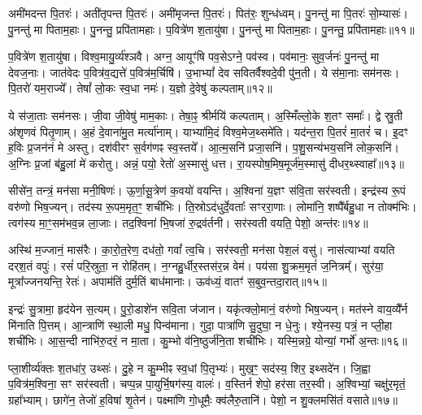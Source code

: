 अमी॑मदन्त पि॒तरः॑।
अती॑तृपन्त पि॒तरः॑।
अमी॑मृजन्त पि॒तरः॑।
पित॑रः॒ शुन्ध॑ध्वम्।
पु॒नन्तु॑ मा पि॒तरः॑ सो॒म्यासः॑।
पु॒नन्तु॑ मा पिताम॒हाः।
पु॒नन्तु॒ प्रपि॑तामहाः।
प॒वित्रे॑ण श॒तायु॑षा।
पु॒नन्तु॑ मा पिताम॒हाः।
पु॒नन्तु॒ प्रपि॑तामहाः॥११॥

प॒वित्रे॑ण श॒तायु॑षा।
विश्व॒मायु॒र्व्य॑श्ञवै।
अग्न॒ आयूꣳ॑षि पव॒से\-ऽग्ने॒ पव॑स्व।
पव॑मानः॒ सुव॒र्जनः॑ पु॒नन्तु॑ मा देवज॒नाः।
जात॑वेदः प॒वित्र॑व॒द्यत्ते॑ प॒वित्र॑म॒र्चिषि॑।
उ॒भाभ्यां᳚ देव सवितर्वैश्वदे॒वी पु॑न॒ती।
ये स॑मा॒नाः सम॑नसः।
पि॒तरो॑ यम॒राज्ये᳚।
तेषां᳚ लो॒कः स्व॒धा नमः॑।
य॒ज्ञो दे॒वेषु॑ कल्पताम्॥१२॥

ये स॑जा॒ताः सम॑नसः।
जी॒वा जी॒वेषु॑ माम॒काः।
तेषा॒ꣴ॒ श्रीर्मयि॑ कल्पताम्।
अ॒स्मिँल्लो॒के श॒तꣳ समाः᳚।
द्वे स्रु॒ती अ॑शृणवं पितृ॒णाम्।
अ॒हं दे॒वाना॑मु॒त मर्त्या॑नाम्।
याभ्या॑मि॒दं विश्व॒मेज॒थ्समे॑ति।
यद॑न्त॒रा पि॒तरं॑ मा॒तरं॑ च।
इ॒दꣳ ह॒विः प्र॒जन॑नं मे अस्तु।
दश॑वीरꣳ स॒र्वग॑णꣴ स्व॒स्तये᳚।
आ॒त्म॒सनि॑ प्रजा॒सनि॑।
प॒शु॒सन्य॑भय॒सनि॑ लोक॒सनि॑।
अ॒ग्निः प्र॒जां ब॑हु॒लां मे॑ करोतु।
अन्नं॒ पयो॒ रेतो॑ अ॒स्मासु॑ धत्त।
रा॒यस्पोष॒मिष॒मूर्ज॑म॒स्मासु॑ दीधर॒थ्स्वाहा᳚॥१३॥\anuvakamend[इ॒न्द्रि॒याय॑ पि॒तरः॑ श॒तायु॑षा पु॒नन्तु॑ मा पिताम॒हाः पु॒नन्तु॒ प्रपि॑तामहाः कल्पताꣴ स्व॒स्तये॒ पञ्च॑ च]

सीसे॑न॒ तन्त्रं॒ मन॑सा मनी॒षिणः॑।
ऊ॒र्णा॒सू॒त्रेण॑ क॒वयो॑ वयन्ति।
अ॒श्विना॑ य॒ज्ञꣳ स॑वि॒ता सर॑स्वती।
इन्द्र॑स्य रू॒पं वरु॑णो भिष॒ज्यन्।
तद॑स्य रू॒पम॒मृत॒ꣳ॒ शची॑भिः।
ति॒स्रो\-ऽद॑धुर्दे॒वताः᳚ सꣳररा॒णाः।
लोमा॑नि॒ शष्पै᳚र्बहु॒धा न तोक्म॑भिः।
त्वग॑स्य मा॒ꣳ॒सम॑भव॒न्न ला॒जाः।
तद॒श्विना॑ भि॒षजा॑ रु॒द्रव॑र्तनी।
सर॑स्वती वयति॒ पेशो॒ अन्त॑रः॥१४॥

अस्थि॑ म॒ज्जानं॒ मास॑रैः।
का॒रो॒त॒रेण॒ दध॑तो॒ गवां᳚ त्व॒चि।
सर॑स्वती॒ मन॑सा पेश॒लं वसु॑।
नास॑त्याभ्यां वयति दर्‌\mbox{}श॒तं वपुः॑।
रसं॑ परि॒स्रुता॒ न रोहि॑तम्।
न॒ग्नहु॒र्धीर॒स्तस॑र॒न्न वेम॑।
पय॑सा शु॒क्रम॒मृतं॑ ज॒नित्रम्᳚।
सुर॑या॒ मूत्रा᳚ज्जनयन्ति॒ रेतः॑।
अपाम॑तिं दुर्म॒तिं बाध॑मानाः।
ऊव॑ध्यं॒ वातꣳ॑ स॒बुव॒न्तदा॒रात्॥१५॥

इन्द्रः॑ सु॒त्रामा॒ हृद॑येन स॒त्यम्।
पु॒रो॒डाशे॑न सवि॒ता ज॑जान।
यकृ॑त्क्लो॒मानं॒ वरु॑णो भिष॒ज्यन्।
मत॑स्ने वाय॒व्यै᳚र्न मि॑नाति पि॒त्तम्।
आ॒न्त्राणि॑ स्था॒ली मधु॒ पिन्व॑माना।
गुदा॒ पात्रा॑णि सु॒दुघा॒ न धे॒नुः।
श्ये॒नस्य॒ पत्रं॒ न प्ली॒हा शची॑भिः।
आ॒स॒न्दी नाभि॑रु॒दरं॒ न मा॒ता।
कु॒म्भो व॑नि॒ष्ठुर्ज॑नि॒ता शची॑भिः।
यस्मि॒न्नग्रे॒ योन्यां॒ गर्भो॑ अ॒न्तः॥१६॥

प्ला॒शीर्व्य॑क्तः श॒तधा॑र॒ उथ्सः॑।
दु॒हे न कु॒म्भीꣴ स्व॒धां पि॒तृभ्यः॑।
मुख॒ꣳ॒ सद॑स्य॒ शिर॒ इथ्सदे॑न।
जि॒ह्वा प॒वित्र॑म॒श्विना॒ सꣳ सर॑स्वती।
चप्प॒न्न पा॒युर्भि॒षग॑स्य॒ वालः॑।
व॒स्तिर्न शेपो॒ हर॑सा तर॒स्वी।
अ॒श्विभ्यां॒ चक्षु॑र॒मृतं॒ ग्रहा᳚भ्याम्।
छागे॑न॒ तेजो॑ ह॒विषा॑ शृ॒तेन॑।
पक्ष्मा॑णि गो॒धूमैः॒ क्व॑लैरु॒तानि॑।
पेशो॒ न शु॒क्लमसि॑तं वसाते॥१७॥

